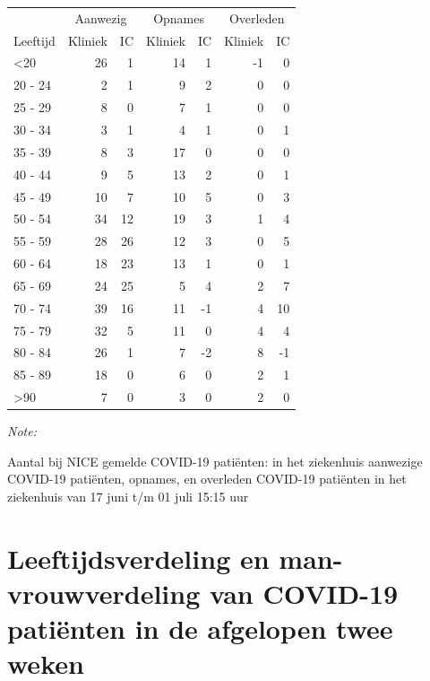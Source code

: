 \documentclass[
  english,
  man,floatsintext]{apa6}
\begin{document}
\begin{table}
\centering\begingroup\fontsize{10}{12}\selectfont

\begin{threeparttable}
\begin{tabular}{lrrrrrr}
\toprule
\multicolumn{1}{c}{ } & \multicolumn{2}{c}{Aanwezig} & \multicolumn{2}{c}{Opnames} & \multicolumn{2}{c}{Overleden} \\
\cmidrule(l{3pt}r{3pt}){2-3} \cmidrule(l{3pt}r{3pt}){4-5} \cmidrule(l{3pt}r{3pt}){6-7}
Leeftijd & Kliniek & IC & Kliniek & IC & Kliniek & IC\\
\midrule
<20 & 26 & 1 & 14 & 1 & -1 & 0\\
20 - 24 & 2 & 1 & 9 & 2 & 0 & 0\\
25 - 29 & 8 & 0 & 7 & 1 & 0 & 0\\
30 - 34 & 3 & 1 & 4 & 1 & 0 & 1\\
35 - 39 & 8 & 3 & 17 & 0 & 0 & 0\\
40 - 44 & 9 & 5 & 13 & 2 & 0 & 1\\
45 - 49 & 10 & 7 & 10 & 5 & 0 & 3\\
50 - 54 & 34 & 12 & 19 & 3 & 1 & 4\\
55 - 59 & 28 & 26 & 12 & 3 & 0 & 5\\
60 - 64 & 18 & 23 & 13 & 1 & 0 & 1\\
65 - 69 & 24 & 25 & 5 & 4 & 2 & 7\\
70 - 74 & 39 & 16 & 11 & -1 & 4 & 10\\
75 - 79 & 32 & 5 & 11 & 0 & 4 & 4\\
80 - 84 & 26 & 1 & 7 & -2 & 8 & -1\\
85 - 89 & 18 & 0 & 6 & 0 & 2 & 1\\
>90 & 7 & 0 & 3 & 0 & 2 & 0\\
\bottomrule
\end{tabular}
\begin{tablenotes}
\item \textit{Note: } 
\item Aantal bij NICE gemelde COVID-19 patiënten: in het ziekenhuis aanwezige COVID-19 patiënten, opnames, en overleden COVID-19 patiënten in het ziekenhuis van 17 juni t/m 01 juli 15:15 uur
\end{tablenotes}
\end{threeparttable}
\endgroup{}
\end{table}

\newpage

\hypertarget{leeftijdsverdeling-en-man-vrouwverdeling-van-covid-19-patiuxebnten-in-de-afgelopen-twee-weken}{%
\section{Leeftijdsverdeling en man-vrouwverdeling van COVID-19 patiënten in de afgelopen twee weken}\label{leeftijdsverdeling-en-man-vrouwverdeling-van-covid-19-patiuxebnten-in-de-afgelopen-twee-weken}}
\end{document}
